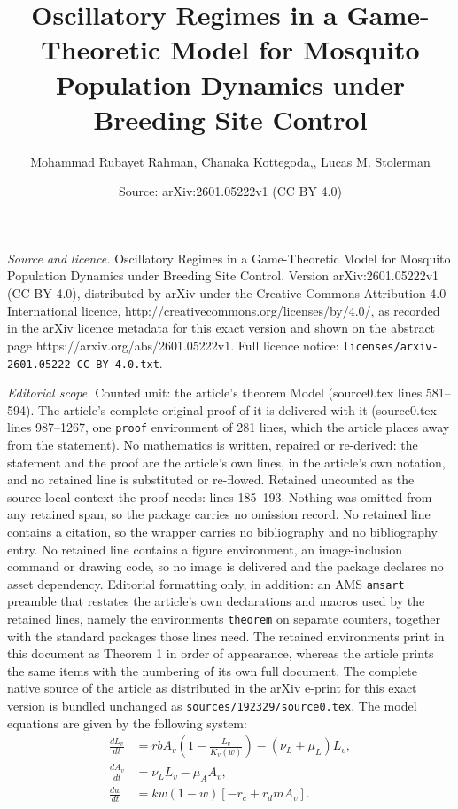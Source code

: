 \documentclass[10pt,a4paper]{amsart}
\title{Oscillatory Regimes in a Game-Theoretic Model for Mosquito Population Dynamics under Breeding Site Control}
\author{Mohammad Rubayet Rahman, Chanaka Kottegoda,, Lucas M. Stolerman}
\date{Source: arXiv:2601.05222v1 (CC BY 4.0)}
\begin{document}
\maketitle

\noindent\emph{Source and licence.} Oscillatory Regimes in a Game-Theoretic Model for Mosquito Population Dynamics under Breeding Site Control. Version arXiv:2601.05222v1 (CC BY 4.0), distributed by arXiv under the Creative Commons Attribution 4.0 International licence, http://creativecommons.org/licenses/by/4.0/, as recorded in the arXiv licence metadata for this exact version and shown on the abstract page https://arxiv.org/abs/2601.05222v1. Full licence notice: \texttt{licenses/arxiv-2601.05222-CC-BY-4.0.txt}.\par\smallskip

\noindent\textit{Editorial scope.} Counted unit: the article's theorem Model (source0.tex lines 581--594). The article's complete original proof of it is delivered with it (source0.tex lines 987--1267, one \texttt{proof} environment of 281 lines, which the article places away from the statement). No mathematics is written, repaired or re-derived: the statement and the proof are the article's own lines, in the article's own notation, and no retained line is substituted or re-flowed.  Retained uncounted as the source-local context the proof needs: lines 185--193.  Nothing was omitted from any retained span, so the package carries no omission record.  No retained line contains a citation, so the wrapper carries no bibliography and no bibliography entry.  No retained line contains a figure environment, an image-inclusion command or drawing code, so no image is delivered and the package declares no asset dependency.  Editorial formatting only, in addition: an AMS \texttt{amsart} preamble that restates the article's own declarations and macros used by the retained lines, namely the environments \texttt{theorem} on separate counters, together with the standard packages those lines need.  The retained environments print in this document as Theorem 1 in order of appearance, whereas the article prints the same items with the numbering of its own full document.  The complete native source of the article as distributed in the arXiv e-print for this exact version is bundled unchanged as \texttt{sources/192329/source0.tex}.
The model equations are given by the following system: 
\begin{equation}
\begin{aligned}
\frac{dL_v}{dt} &= rbA_v \left(1 - \frac{L_v}{K_v(w)} \right) - (\nu_L + \mu_L)L_v, \\
\frac{dA_v}{dt} &= \nu_L L_v - \mu_A A_v, \\
\frac{dw}{dt}   &= k w(1 - w)\left[-r_c + r_d m A_v\right].
\end{aligned}
\label{eq:behavioral_entomological_system}
\end{equation}
\end{document}
